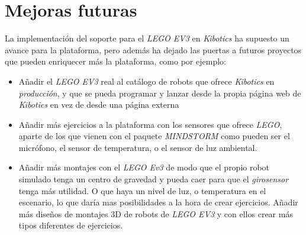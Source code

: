 \section{Mejoras futuras}
\label{sec:mejoras_futuras}

La implementación del soporte para el \textit{LEGO EV3} en \textit{Kibotics} ha supuesto un avance para la plataforma, pero además ha dejado las puertas a futuros proyectos que pueden enriquecer más la plataforma, como por ejemplo:

\begin{itemize}
    \item Añadir el \textit{LEGO EV3} real al catálogo de robots que ofrece \textit{Kibotics} en \textit{producción}, y que se pueda programar y lanzar desde la propia página web de \textit{Kibotics} en vez de desde una página externa  
    \item Añadir más ejercicios a la plataforma con los sensores que ofrece \textit{LEGO}, aparte de los que vienen con el paquete \textit{MINDSTORM} como pueden ser el micrófono, el sensor de temperatura, o el sensor de luz ambiental. 
    \item Añadir más montajes con el \textit{LEGO Ev3} de modo que el propio robot simulado tenga un centro de gravedad y pueda caer para que el \textit{girosensor} tenga más utilidad. O que haya un nivel de luz, o temperatura en el escenario, lo que daría mas posibilidades a la hora de crear ejercicios. Añadir más diseños de montajes 3D de robots de \textit{LEGO EV3} y con ellos crear más tipos diferentes de ejercicios.
 
 \end{itemize} 
